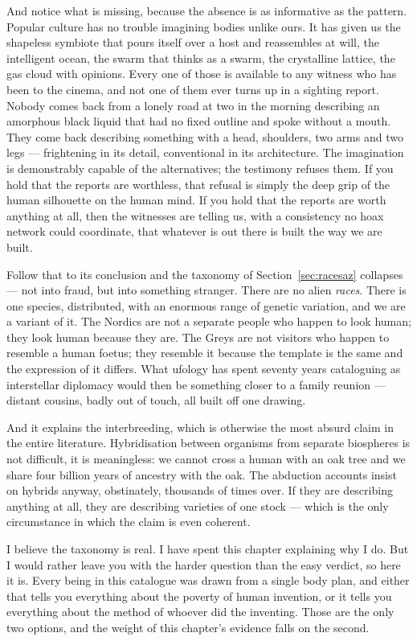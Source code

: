 And notice what is missing, because the absence is as informative as the pattern. Popular
culture has no trouble imagining bodies unlike ours. It has given us the shapeless
symbiote that pours itself over a host and reassembles at will, the intelligent ocean, the
swarm that thinks as a swarm, the crystalline lattice, the gas cloud with opinions. Every
one of those is available to any witness who has been to the cinema, and not one of them
ever turns up in a sighting report. Nobody comes back from a lonely road at two in the
morning describing an amorphous black liquid that had no fixed outline and spoke without a
mouth. They come back describing something with a head, shoulders, two arms and two legs
--- frightening in its detail, conventional in its architecture. The imagination is
demonstrably capable of the alternatives; the testimony refuses them. If you hold that the
reports are worthless, that refusal is simply the deep grip of the human silhouette on the
human mind. If you hold that the reports are worth anything at all, then the witnesses are
telling us, with a consistency no hoax network could coordinate, that whatever is out there
is built the way we are built.

Follow that to its conclusion and the taxonomy of Section~\ref{sec:racesaz} collapses --- not
into fraud, but into something stranger. There are no alien \emph{races}. There is one
species, distributed, with an enormous range of genetic variation, and we are a variant of
it. The Nordics are not a separate people who happen to look human; they look human because
they are. The Greys are not visitors who happen to resemble a human foetus; they resemble it
because the template is the same and the expression of it differs. What ufology has spent
seventy years cataloguing as interstellar diplomacy would then be something closer to a
family reunion --- distant cousins, badly out of touch, all built off one drawing.

And it explains the interbreeding, which is otherwise the most absurd claim in the entire
literature. Hybridisation between organisms from separate biospheres is not difficult, it is
meaningless: we cannot cross a human with an oak tree and we share four billion years of
ancestry with the oak. The abduction accounts insist on hybrids anyway, obstinately,
thousands of times over. If they are describing anything at all, they are describing
varieties of one stock --- which is the only circumstance in which the claim is even
coherent.

I believe the taxonomy is real. I have spent this chapter explaining why I do. But
I would rather leave you with the harder question than the easy verdict, so here it is. Every
being in this catalogue was drawn from a single body plan, and either that tells you
everything about the poverty of human invention, or it tells you everything about the
method of whoever did the inventing. 
Those are the only two options, and the weight of this chapter's evidence falls on the second.

